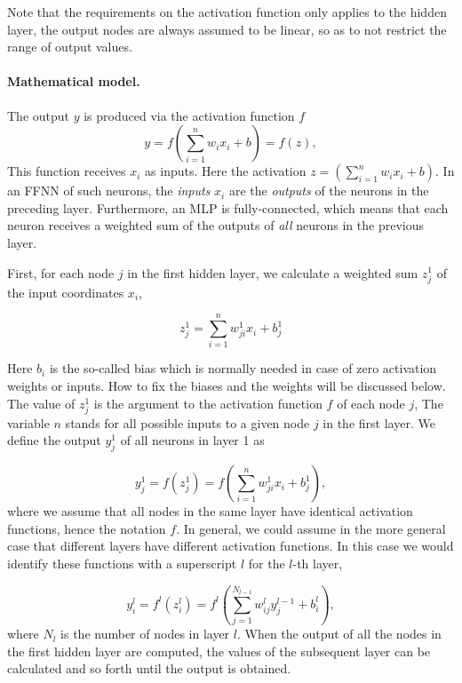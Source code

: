 \documentclass[%
oneside,                 %
final,                   %
10pt]{article}
\begin{document}
Note that the requirements on the activation function only applies to
the hidden layer, the output nodes are always assumed to be linear, so
as to not restrict the range of output values.


\paragraph{Mathematical model.}
The output $y$ is produced via the activation function $f$
\[
 y = f\left(\sum_{i=1}^n w_ix_i + b \right) = f(z),
\]
This function receives $x_i$ as inputs.
Here the activation $z=(\sum_{i=1}^n w_ix_i+b)$. 
In an FFNN of such neurons, the \emph{inputs} $x_i$ are the \emph{outputs} of
the neurons in the preceding layer. Furthermore, an MLP is
fully-connected, which means that each neuron receives a weighted sum
of the outputs of \emph{all} neurons in the previous layer.

First, for each node $j$ in the first hidden layer, we calculate a weighted sum $z_j^1$ of the input coordinates $x_i$,

\begin{equation} z_j^1 = \sum_{i=1}^{n} w_{ji}^1 x_i + b_j^1
\end{equation}

Here $b_i$ is the so-called bias which is normally needed in
case of zero activation weights or inputs. How to fix the biases and
the weights will be discussed below.  The value of $z_j^1$ is the
argument to the activation function $f$ of each node $j$, The
variable $n$ stands for all possible inputs to a given node $j$ in the
first layer.  We define  the output $y_j^1$ of all neurons in layer 1 as

\begin{equation}
 y_j^1 = f(z_j^1) = f\left(\sum_{i=1}^n w_{ji}^1 x_i  + b_j^1\right),
 \label{outputLayer1}
\end{equation}
where we assume that all nodes in the same layer have identical
activation functions, hence the notation $f$. In general, we could assume in the more general case that different layers have different activation functions.
In this case we would identify these functions with a superscript $l$ for the $l$-th layer,

\begin{equation}
 y_i^l = f^l(z_i^l) = f^l\left(\sum_{j=1}^{N_{l-1}} w_{ij}^l y_j^{l-1} + b_i^l\right),
 \label{generalLayer}
\end{equation}
where $N_l$ is the number of nodes in layer $l$. When the output of
all the nodes in the first hidden layer are computed, the values of
the subsequent layer can be calculated and so forth until the output
is obtained.
\end{document}
